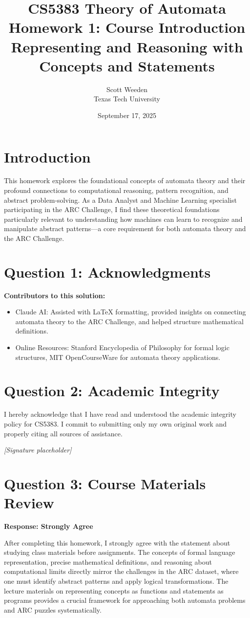 \documentclass[12pt]{article}
\title{CS5383 Theory of Automata\\
Homework 1: Course Introduction\\
Representing and Reasoning with Concepts and Statements}
\author{Scott Weeden\\
Texas Tech University}
\date{September 17, 2025}
\theoremstyle{definition}
\begin{document}
\maketitle

\section*{Introduction}
This homework explores the foundational concepts of automata theory and their profound connections to computational reasoning, pattern recognition, and abstract problem-solving. As a Data Analyst and Machine Learning specialist participating in the ARC Challenge, I find these theoretical foundations particularly relevant to understanding how machines can learn to recognize and manipulate abstract patterns—a core requirement for both automata theory and the ARC Challenge.

\section*{Question 1: Acknowledgments}
\textbf{Contributors to this solution:}
\begin{itemize}
    \item Claude AI: Assisted with LaTeX formatting, provided insights on connecting automata theory to the ARC Challenge, and helped structure mathematical definitions.
    \item Online Resources: Stanford Encyclopedia of Philosophy for formal logic structures, MIT OpenCourseWare for automata theory applications.
\end{itemize}

\section*{Question 2: Academic Integrity}
I hereby acknowledge that I have read and understood the academic integrity policy for CS5383. I commit to submitting only my own original work and properly citing all sources of assistance.

\textit{[Signature placeholder]}

\section*{Question 3: Course Materials Review}
\textbf{Response: Strongly Agree}

After completing this homework, I strongly agree with the statement about studying class materials before assignments. The concepts of formal language representation, precise mathematical definitions, and reasoning about computational limits directly mirror the challenges in the ARC dataset, where one must identify abstract patterns and apply logical transformations. The lecture materials on representing concepts as functions and statements as programs provides a crucial framework for approaching both automata problems and ARC puzzles systematically.
\end{document}

